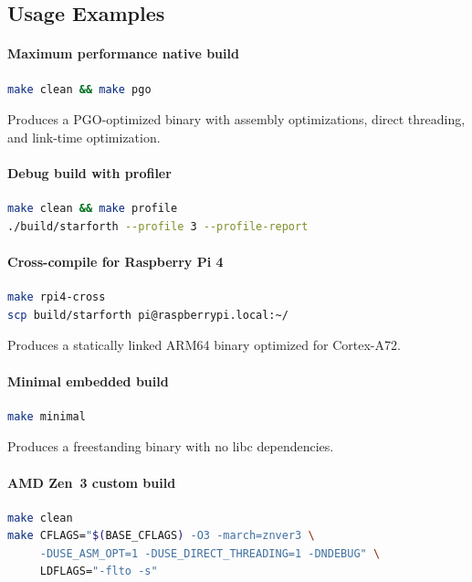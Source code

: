 \subsection{Usage Examples}
\label{sec:build-examples}

\paragraph{Maximum performance native build}
\begin{lstlisting}[language=bash]
make clean && make pgo
\end{lstlisting}
Produces a PGO-optimized binary with assembly optimizations, direct threading,
and link-time optimization.

\paragraph{Debug build with profiler}
\begin{lstlisting}[language=bash]
make clean && make profile
./build/starforth --profile 3 --profile-report
\end{lstlisting}

\paragraph{Cross-compile for Raspberry Pi 4}
\begin{lstlisting}[language=bash]
make rpi4-cross
scp build/starforth pi@raspberrypi.local:~/
\end{lstlisting}
Produces a statically linked ARM64 binary optimized for Cortex-A72.

\paragraph{Minimal embedded build}
\begin{lstlisting}[language=bash]
make minimal
\end{lstlisting}
Produces a freestanding binary with no libc dependencies.

\paragraph{AMD Zen~3 custom build}
\begin{lstlisting}[language=bash]
make clean
make CFLAGS="$(BASE_CFLAGS) -O3 -march=znver3 \
     -DUSE_ASM_OPT=1 -DUSE_DIRECT_THREADING=1 -DNDEBUG" \
     LDFLAGS="-flto -s"
\end{lstlisting}

